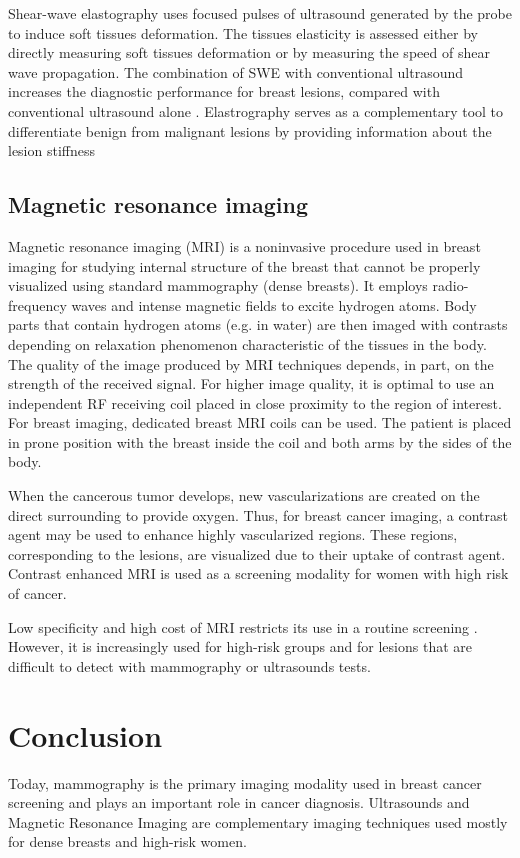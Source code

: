Shear-wave elastography uses focused pulses of ultrasound generated by the probe to induce soft tissues deformation. The tissues elasticity is assessed either by directly measuring soft tissues deformation or by measuring the speed of shear wave propagation. The combination of SWE with conventional ultrasound
increases the diagnostic performance for breast lesions, compared
with conventional ultrasound alone \citep{youk_shear_2017}.  Elastrography serves as a complementary tool to differentiate benign from malignant lesions by providing information about the lesion stiffness\citep{itoh_breast_2006,olgun_use_2014}
 
\subsection{Magnetic resonance imaging}\label{subsection:mri}

Magnetic resonance imaging (MRI) is a noninvasive procedure used in breast imaging for studying internal structure of the breast that cannot be properly visualized using standard mammography (dense breasts).  It employs radio-frequency waves and intense magnetic fields to excite hydrogen atoms. Body parts that contain hydrogen atoms (e.g. in water) are then imaged with contrasts depending on relaxation phenomenon characteristic of the tissues in the body. The quality of the image produced by MRI techniques depends, in part, on the strength of the received signal. For higher image quality, it is optimal to use an independent RF receiving coil placed in close proximity to the region of interest.  For breast imaging, dedicated breast MRI coils can be used. The patient is placed in prone position with the breast inside the coil and both arms by the sides of the body.

When the cancerous tumor develops, new vascularizations are created on the direct surrounding to provide oxygen.
Thus, for breast cancer imaging, a contrast agent may be used to enhance highly vascularized regions. These regions, corresponding to the lesions, are visualized due to their uptake of contrast agent. Contrast enhanced MRI is used as a screening modality for women with high risk of cancer.  

Low specificity and high cost of MRI restricts its use in a routine screening \citep{peters_meta_2008}. However, it is increasingly used for high-risk groups and for lesions that are difficult to detect with mammography or ultrasounds tests. 

\section{Conclusion}\label{section:conlusion}
Today, mammography is the primary imaging modality used in breast cancer screening and plays an important role in cancer diagnosis. Ultrasounds and Magnetic Resonance Imaging are complementary imaging techniques used mostly for dense breasts and high-risk women.
 
